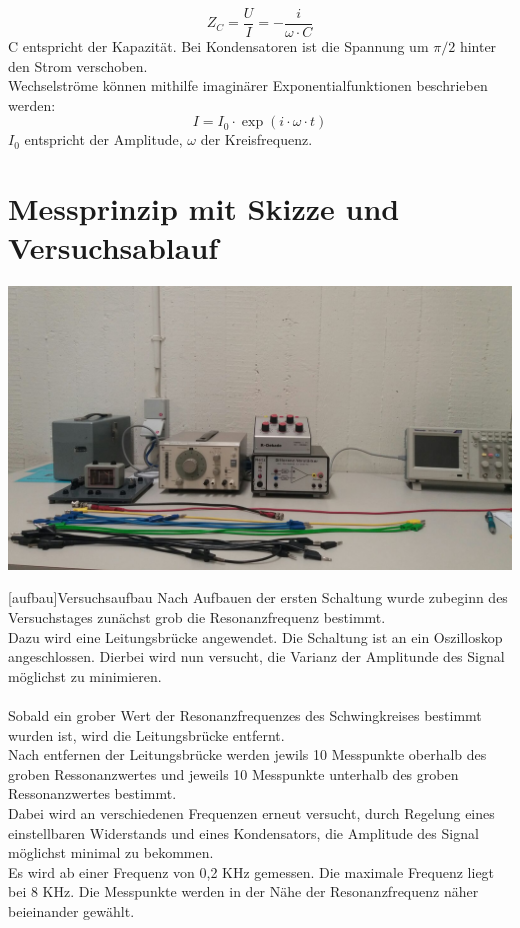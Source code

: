 \documentclass[12pt,a4paper,]{scrreprt}
\begin{document}
 \begin{equation}
 Z_C = \frac{U}{I} = -\frac{i}{\omega \cdot C}
 \end{equation}
C entspricht der Kapazität. Bei Kondensatoren ist die Spannung um $\pi/2$ hinter den Strom verschoben.\\
Wechselströme können mithilfe imaginärer Exponentialfunktionen beschrieben werden:\\
\begin{equation}
I=I_0 \cdot \exp(i\cdot \omega \cdot t)
\end{equation}
$I_0$ entspricht der Amplitude, $\omega$ der Kreisfrequenz.\\
\pagebreak

\chapter{Messprinzip mit Skizze und Versuchsablauf}
\begin{center}
\includegraphics[scale=0.2]{Daten/aufbau.jpeg}
\end{center}
[aufbau]{Versuchsaufbau}
Nach Aufbauen der ersten Schaltung wurde zubeginn des Versuchstages zunächst grob die Resonanzfrequenz bestimmt. \\
Dazu wird eine Leitungsbrücke angewendet. Die Schaltung ist an ein Oszilloskop angeschlossen. Dierbei wird nun versucht, die Varianz der  Amplitunde des Signal möglichst zu minimieren.\\
\\
Sobald ein grober Wert der Resonanzfrequenzes des Schwingkreises bestimmt wurden ist, wird die Leitungsbrücke entfernt.\\
Nach entfernen der Leitungsbrücke werden jewils 10 Messpunkte oberhalb des groben Ressonanzwertes und jeweils 10 Messpunkte unterhalb des groben Ressonanzwertes bestimmt.\\
Dabei wird an verschiedenen Frequenzen erneut versucht, durch Regelung eines einstellbaren Widerstands und eines Kondensators, die Amplitude des Signal möglichst minimal zu bekommen. \\
Es wird ab einer Frequenz von 0,2 KHz gemessen. Die maximale Frequenz liegt bei 8 KHz. Die Messpunkte werden in der Nähe der Resonanzfrequenz näher beieinander gewählt.
	\pagebreak
\end{document}
